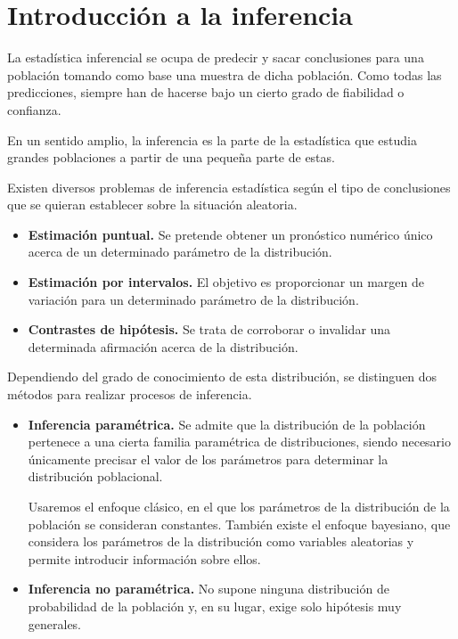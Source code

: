 \chapter{Introducción a la inferencia}

La estadística inferencial se ocupa de predecir y sacar conclusiones para una población tomando como base una muestra de dicha población.
Como todas las predicciones, siempre han de hacerse bajo un cierto grado de fiabilidad o confianza.

En un sentido amplio, la inferencia es la parte de la estadística que estudia grandes poblaciones a partir de una pequeña parte de estas.

Existen diversos problemas de inferencia estadística según el tipo de conclusiones que se quieran establecer sobre la situación aleatoria.
\begin{itemize}
    \item \textbf{Estimación puntual.}
    Se pretende obtener un pronóstico numérico único acerca de un determinado parámetro de la distribución.
    \item \textbf{Estimación por intervalos.}
    El objetivo es proporcionar un margen de variación para un determinado parámetro de la distribución.
    \item \textbf{Contrastes de hipótesis.}
    Se trata de corroborar o invalidar una determinada afirmación acerca de la distribución.
\end{itemize}

Dependiendo del grado de conocimiento de esta distribución, se distinguen dos métodos para realizar procesos de inferencia.
\begin{itemize}
    \item \textbf{Inferencia paramétrica.}
    Se admite que la distribución de la población pertenece a una cierta familia paramétrica de distribuciones, siendo necesario únicamente precisar el valor de los parámetros para determinar la distribución poblacional.
    
    Usaremos el enfoque clásico, en el que los parámetros de la distribución de la población se consideran constantes.
    También existe el enfoque bayesiano, que considera los parámetros de la distribución como variables aleatorias y permite introducir información sobre ellos.
    
    \item \textbf{Inferencia no paramétrica.}
    No supone ninguna distribución de probabilidad de la población y, en su lugar, exige solo hipótesis muy generales.
\end{itemize}

